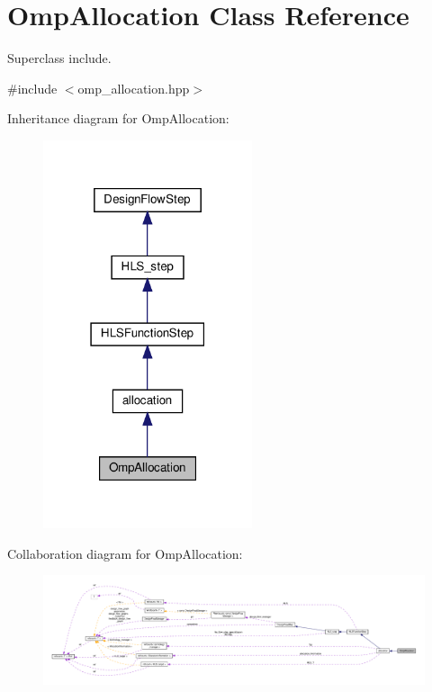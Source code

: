 \hypertarget{classOmpAllocation}{}\section{Omp\+Allocation Class Reference}
\label{classOmpAllocation}


Superclass include.  




{\ttfamily \#include $<$omp\+\_\+allocation.\+hpp$>$}



Inheritance diagram for Omp\+Allocation\+:
\nopagebreak
\begin{figure}[H]
\begin{center}
\leavevmode
\includegraphics[width=174pt]{d5/da8/classOmpAllocation__inherit__graph}
\end{center}
\end{figure}


Collaboration diagram for Omp\+Allocation\+:
\nopagebreak
\begin{figure}[H]
\begin{center}
\leavevmode
\includegraphics[width=350pt]{d3/d2d/classOmpAllocation__coll__graph}
\end{center}
\end{figure}
